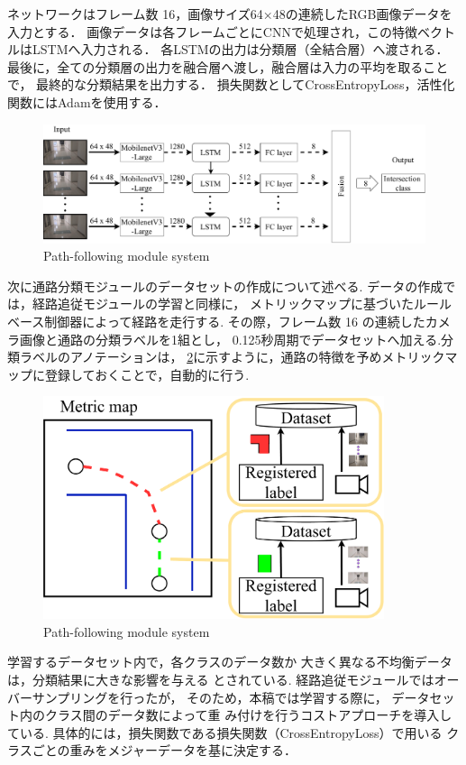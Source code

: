 ネットワークはフレーム数 16，画像サイズ64×48の連続したRGB画像データを入力とする．
画像データは各フレームごとにCNNで処理され，この特徴ベクトルはLSTMへ入力される．
各LSTMの出力は分類層（全結合層）へ渡される．
最後に，全ての分類層の出力を融合層へ渡し，融合層は入力の平均を取ることで，
最終的な分類結果を出力する．
損失関数としてCrossEntropyLoss，活性化関数にはAdamを使用する．
\begin{figure}[htbp]
    \centering
     \includegraphics[width=120mm]{images/pdf/network-intersect.pdf}
     \caption{Path-following module system}
     \label{fig:int_net}
\end{figure}

次に通路分類モジュールのデータセットの作成について述べる.
データの作成では，経路追従モジュールの学習と同様に，
メトリックマップに基づいたルールベース制御器によって経路を走行する.
その際，フレーム数 16 の連続したカメラ画像と通路の分類ラベルを1組とし，
0.125秒周期でデータセットへ加える.分類ラベルのアノテーションは，
\ref{fig:int_net}に示すように，通路の特徴を予めメトリックマップに登録しておくことで，自動的に行う.
\begin{figure}[htbp]
    \centering
     \includegraphics[width=100mm]{images/pdf/map_label.pdf}
     \caption{Path-following module system}
     \label{fig:int_net}
\end{figure}
\newpage
学習するデータセット内で，各クラスのデータ数か
大きく異なる不均衡データは，分類結果に大きな影響を与える
とされている. 経路追従モジュールではオーバーサンプリングを行ったが，
そのため，本稿では学習する際に，
データセット内のクラス間のデータ数によって重
み付けを行うコストアプローチを導入している.
具体的には，損失関数である損失関数（CrossEntropyLoss）で用いる
クラスごとの重みをメジャーデータを基に決定する．